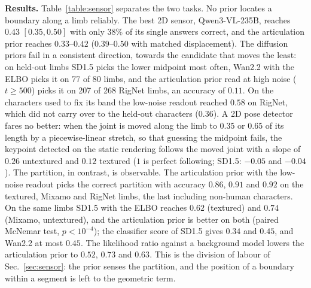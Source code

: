 \documentclass[lettersize,journal]{IEEEtran}
\newenvironment{revblock}{\par\color{red}}{\par}
\begin{document}
\begin{revblock}
\textbf{Results.} Table~\ref{table:sensor} separates the two tasks. No prior locates a boundary
along a limb reliably. The best 2D sensor, Qwen3-VL-235B, reaches $0.43$ $[0.35,0.50]$ with only
38\% of its single answers correct, and the articulation prior reaches $0.33$--$0.42$
($0.39$--$0.50$ with matched displacement). The diffusion priors fail in a consistent direction,
towards the candidate that moves the least: on held-out limbs SD1.5 picks the lower midpoint
most often, Wan2.2 with the ELBO picks it on 77 of 80 limbs, and the articulation prior read at
high noise ($t\geq500$) picks it on 207 of 268 RigNet limbs, an accuracy of $0.11$. On the
characters used to fix its band the low-noise readout reached $0.58$ on RigNet, which did not
carry over to the held-out characters ($0.36$). A 2D pose detector \cite{yang2023dwpose} fares
no better: when the joint is moved along the limb to $0.35$ or $0.65$ of its length by a
piecewise-linear stretch, so that guessing the midpoint fails, the keypoint detected on the
static rendering follows the moved joint with a slope of $0.26$ untextured and $0.12$ textured
($1$ is perfect following; SD1.5: $-0.05$ and $-0.04$). The partition, in contrast, is
observable. The articulation prior with the low-noise readout picks the correct partition with
accuracy $0.86$, $0.91$ and $0.92$ on the textured, Mixamo and RigNet limbs, the last including
non-human characters. On the same limbs SD1.5 with the ELBO reaches $0.62$ (textured) and $0.74$
(Mixamo, untextured), and the articulation prior is better on both (paired McNemar test,
$p<10^{-4}$); the classifier score of SD1.5 gives $0.34$ and $0.45$, and Wan2.2 at most $0.45$.
The likelihood ratio against a background model lowers the articulation prior to
$0.52$, $0.73$ and $0.63$. This is the division of labour of Sec.~\ref{sec:sensor}:
the prior senses the partition, and the position of a boundary within a segment is left to the
geometric term.
\end{revblock}
\end{document}
